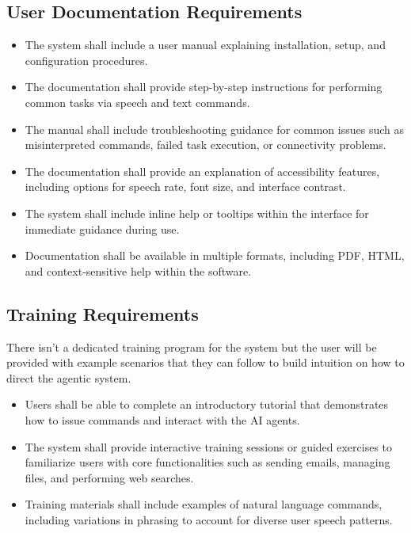 \documentclass[12pt]{article}
\begin{document}
\subsection{User Documentation Requirements}
\begin{itemize}
  \item The system shall include a user manual explaining
  installation, setup, and configuration procedures.
  \item The documentation shall provide step-by-step instructions for
  performing common tasks via speech and text commands.
  \item The manual shall include troubleshooting guidance for common
  issues such as misinterpreted commands, failed task execution, or
  connectivity problems.
  \item The documentation shall provide an explanation of
  accessibility features, including options for speech rate, font
  size, and interface contrast.
  \item The system shall include inline help or tooltips within the
  interface for immediate guidance during use.
  \item Documentation shall be available in multiple formats,
  including PDF, HTML, and context-sensitive help within the software.
\end{itemize}

\subsection{Training Requirements}
There isn't a dedicated training program for the system but the user
will be provided with example scenarios that they can follow to build
intuition on how to direct the agentic system.

\begin{itemize}
  \item Users shall be able to complete an introductory tutorial that
  demonstrates how to issue commands and interact with the AI agents.
  \item The system shall provide interactive training sessions or
  guided exercises to familiarize users with core functionalities such
  as sending emails, managing files, and performing web searches.
  \item Training materials shall include examples of natural language
  commands, including variations in phrasing to account for diverse
  user speech patterns.
\end{itemize}
\end{document}
